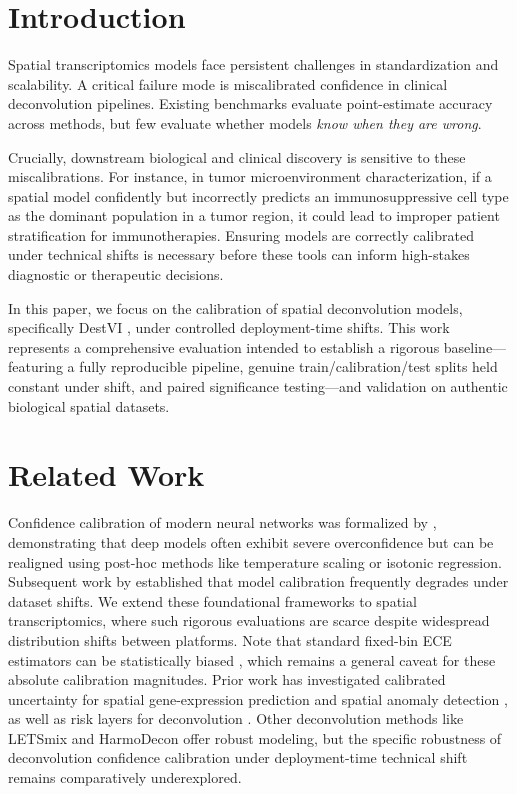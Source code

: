 \documentclass[unnumsec,webpdf,modern,large]{oup-authoring-template}
\begin{document}
\section{Introduction}
Spatial transcriptomics models face persistent challenges in standardization and scalability. A critical failure mode is miscalibrated confidence in clinical deconvolution pipelines. Existing benchmarks evaluate point-estimate accuracy across methods, but few evaluate whether models \textit{know when they are wrong}. 

Crucially, downstream biological and clinical discovery is sensitive to these miscalibrations. For instance, in tumor microenvironment characterization, if a spatial model confidently but incorrectly predicts an immunosuppressive cell type as the dominant population in a tumor region, it could lead to improper patient stratification for immunotherapies. Ensuring models are correctly calibrated under technical shifts is necessary before these tools can inform high-stakes diagnostic or therapeutic decisions.

In this paper, we focus on the calibration of spatial deconvolution models, specifically DestVI \citep{lopez2022destvi}, under controlled deployment-time shifts. This work represents a comprehensive evaluation intended to establish a rigorous baseline---featuring a fully reproducible pipeline, genuine train/calibration/test splits held constant under shift, and paired significance testing---and validation on authentic biological spatial datasets.

\section{Related Work}
Confidence calibration of modern neural networks was formalized by \citet{guo2017calibration}, demonstrating that deep models often exhibit severe overconfidence but can be realigned using post-hoc methods like temperature scaling or isotonic regression. Subsequent work by \citet{ovadia2019can} established that model calibration frequently degrades under dataset shifts. We extend these foundational frameworks to spatial transcriptomics, where such rigorous evaluations are scarce despite widespread distribution shifts between platforms. Note that standard fixed-bin ECE estimators can be statistically biased \citep{roelofs2022mitigating}, which remains a general caveat for these absolute calibration magnitudes. Prior work has investigated calibrated uncertainty for spatial gene-expression prediction \citep{sun2024tissue} and spatial anomaly detection \citep{spade2026}, as well as risk layers for deconvolution \citep{relist2026}. Other deconvolution methods like LETSmix \citep{zhan2025letsmix} and HarmoDecon \citep{wang2025harmodecon} offer robust modeling, but the specific robustness of deconvolution confidence calibration under deployment-time technical shift remains comparatively underexplored.
\end{document}
